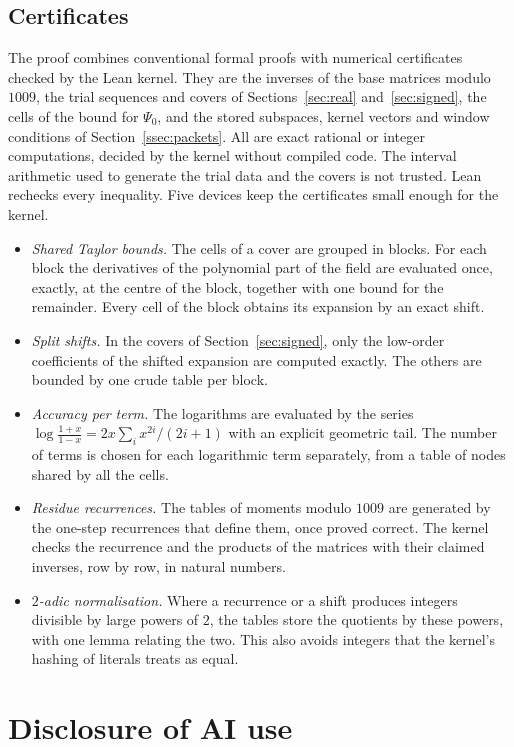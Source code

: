 \subsection{Certificates}
The proof combines conventional formal proofs with numerical certificates checked by the Lean kernel. They
are the inverses of the base matrices modulo $1009$, the trial sequences and covers of
Sections~\ref{sec:real} and~\ref{sec:signed}, the cells of the bound for $\Psi_0$, and the stored subspaces,
kernel vectors and window conditions of Section~\ref{ssec:packets}. All are exact rational or integer
computations, decided by the kernel without compiled code. The interval arithmetic used to generate the trial
data and the covers \cite{Arb} is not trusted. Lean rechecks every inequality. Five devices keep the
certificates small enough for the kernel.
\begin{itemize}
\item \emph{Shared Taylor bounds.} The cells of a cover are grouped in blocks. For each block the derivatives of
the polynomial part of the field are evaluated once, exactly, at the centre of the block, together with one
bound for the remainder. Every cell of the block obtains its expansion by an exact shift.
\item \emph{Split shifts.} In the covers of Section~\ref{sec:signed}, only the low-order coefficients of the
shifted expansion are computed exactly. The others are bounded by one crude table per block.
\item \emph{Accuracy per term.} The logarithms are evaluated by the series
$\log\frac{1+x}{1-x}=2x\sum_ix^{2i}/(2i+1)$ with an explicit geometric tail. The number of terms is chosen for
each logarithmic term separately, from a table of nodes shared by all the cells.
\item \emph{Residue recurrences.} The tables of moments modulo $1009$ are generated by the one-step recurrences
that define them, once proved correct. The kernel checks the recurrence and the products of the matrices with
their claimed inverses, row by row, in natural numbers.
\item \emph{$2$-adic normalisation.} Where a recurrence or a shift produces integers divisible by large powers
of $2$, the tables store the quotients by these powers, with one lemma relating the two. This also avoids
integers that the kernel's hashing of literals treats as equal.
\end{itemize}

\section*{Disclosure of AI use}

